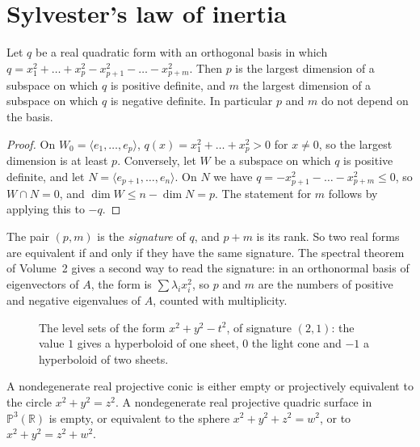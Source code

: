 \section{Sylvester's law of inertia}

\begin{theorem}\label{geometry:thm:sylvester}
Let $q$ be a real quadratic form with an orthogonal basis in which $q=x_1^2+\dots+x_p^2-x_{p+1}^2-\dots-x_{p+m}^2$. Then $p$ is the largest dimension
of a subspace on which $q$ is positive definite, and $m$ the largest dimension of a subspace on which $q$ is negative definite. In particular $p$ and
$m$ do not depend on the basis.
\end{theorem}

\begin{proof}
On $W_0=\langle e_1,\dots,e_p\rangle$, $q(x)=x_1^2+\dots+x_p^2>0$ for $x\ne0$, so the largest dimension is at least $p$. Conversely, let $W$ be a
subspace on which $q$ is positive definite, and let $N=\langle e_{p+1},\dots,e_n\rangle$. On $N$ we have $q=-x_{p+1}^2-\dots-x_{p+m}^2\le0$, so
$W\cap N=0$, and $\dim W\le n-\dim N=p$. The statement for $m$ follows by applying this to $-q$.
\end{proof}

The pair $(p,m)$ is the \emph{signature} of $q$, and $p+m$ is its rank. So two real forms are equivalent if and only if they have the same signature.
The spectral theorem of Volume~2 gives a second way to read the signature: in an orthonormal basis of eigenvectors of $A$, the form is
$\sum\lambda_ix_i^2$, so $p$ and $m$ are the numbers of positive and negative eigenvalues of $A$, counted with multiplicity.

\begin{figure}[ht]
\centering
{}
\caption{The level sets of the form $x^2+y^2-t^2$, of signature $(2,1)$: the value $1$ gives a hyperboloid of one sheet, $0$ the light cone and
$-1$ a hyperboloid of two sheets.}
\label{geometry:fig:lorentz}
\end{figure}

\begin{corollary}\label{geometry:cor:realconics}
A nondegenerate real projective conic is either empty or projectively equivalent to the circle $x^2+y^2=z^2$. A nondegenerate real projective quadric
surface in $\mathbb P^3(\mathbb R)$ is empty, or equivalent to the sphere $x^2+y^2+z^2=w^2$, or to $x^2+y^2=z^2+w^2$.
\end{corollary}

